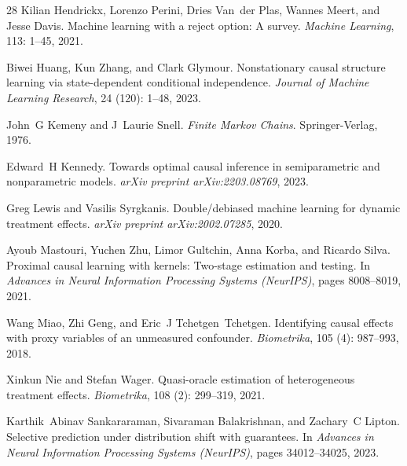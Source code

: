 \documentclass[twoside]{article}
\theoremstyle{definition}
\begin{document}
\begin{thebibliography}{28}
Kilian Hendrickx, Lorenzo Perini, Dries Van~der Plas, Wannes Meert, and Jesse Davis.
\newblock Machine learning with a reject option: A survey.
\newblock \emph{Machine Learning}, 113: 1--45, 2021.

Biwei Huang, Kun Zhang, and Clark Glymour.
\newblock Nonstationary causal structure learning via state-dependent conditional independence.
\newblock \emph{Journal of Machine Learning Research}, 24 (120): 1--48, 2023.

John~G Kemeny and J~Laurie Snell.
\newblock \emph{Finite Markov Chains}.
\newblock Springer-Verlag, 1976.

Edward~H Kennedy.
\newblock Towards optimal causal inference in semiparametric and nonparametric models.
\newblock \emph{arXiv preprint arXiv:2203.08769}, 2023.

Greg Lewis and Vasilis Syrgkanis.
\newblock Double/debiased machine learning for dynamic treatment effects.
\newblock \emph{arXiv preprint arXiv:2002.07285}, 2020.

Ayoub Mastouri, Yuchen Zhu, Limor Gultchin, Anna Korba, and Ricardo Silva.
\newblock Proximal causal learning with kernels: Two-stage estimation and testing.
\newblock In \emph{Advances in Neural Information Processing Systems (NeurIPS)}, pages 8008--8019, 2021.

Wang Miao, Zhi Geng, and Eric~J Tchetgen~Tchetgen.
\newblock Identifying causal effects with proxy variables of an unmeasured confounder.
\newblock \emph{Biometrika}, 105 (4): 987--993, 2018.

Xinkun Nie and Stefan Wager.
\newblock Quasi-oracle estimation of heterogeneous treatment effects.
\newblock \emph{Biometrika}, 108 (2): 299--319, 2021.

Karthik~Abinav Sankararaman, Sivaraman Balakrishnan, and Zachary~C Lipton.
\newblock Selective prediction under distribution shift with guarantees.
\newblock In \emph{Advances in Neural Information Processing Systems (NeurIPS)}, pages 34012--34025, 2023.


\end{thebibliography}
\end{document}
